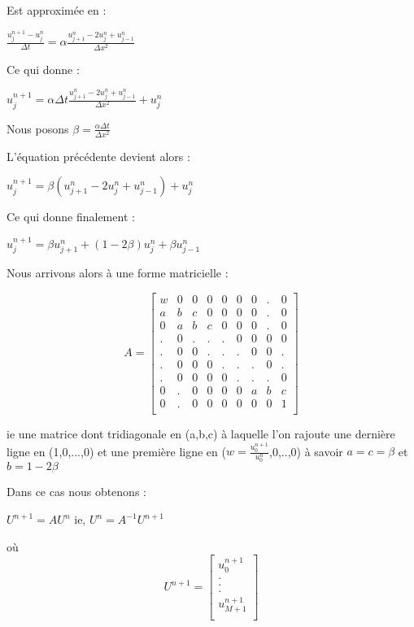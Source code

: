 \documentclass[a4paper, 12pt]{article}
\begin{document}
Est approximée en : 

$\frac{u^{n+1}_j-u^n_j}{\Delta{t}}=\alpha \frac{u^n_{j+1}-2u^n_j+u^n_{j-1}}{\Delta{x}^2}$

Ce qui donne : 

$u^{n+1}_j=\alpha \Delta{t} \frac{u^n_{j+1}-2u^n_j+u^n_{j-1}}{\Delta{x}^2}+u^n_j$

Nous posons $\beta = \frac{\alpha \Delta{t}}{\Delta{x}^2}$

L'équation précédente devient alors :

$u^{n+1}_j= \beta (u^n_{j+1}-2u^n_j+u^n_{j-1})+u^n_j$

Ce qui donne finalement : 

$u^{n+1}_j= \beta u^n_{j+1} +  (1-2\beta) u^n_j + \beta u^n_{j-1}$

Nous arrivons alors à une forme matricielle :

\[
A =
\left[ {\begin{array}{ccccccccc}

w & 0 & 0 & 0  & 0 & 0 & 0 & . & 0\\ 
a  & b  & c  & 0  & 0  & 0  & 0  & .  & 0 \\ 
0  & a  & b  & c  & 0  & 0  & 0  & .  & 0\\ 
.  & 0  & .  & .  & .  & 0  & 0  & 0  & 0\\ 
.  & 0  & 0  & .  & .  & .  & 0  & 0  & . \\
.  & 0  & 0  & 0  & .  & .  & .  & 0  & . \\
.  & 0  & 0  & 0  & 0  & .  & .  & .  & 0 \\
0  & .  & 0  & 0  & 0  & 0  & a  & b  & c\\ 
0  & .  & 0  & 0  & 0  & 0  & 0  & 0  & 1 \\
\end{array} } \right]
\]

ie une matrice dont tridiagonale en (a,b,c) à laquelle l'on rajoute une dernière ligne en (1,0,...,0) et une première ligne en ($w=\frac{u^{n+1}_0}{u^n_0}$,0,..,0)
à savoir $a=c=\beta$ et $b=1-2\beta$

Dans ce cas nous obtenons : 

$U^{n+1}=AU^n$
ie,
$U^n=A^{-1}U^{n+1}$

où
\[
U^{n+1} =
\left[ {\begin{array}{c}
        u^{n+1}_0\\
        .\\
        .\\
        .\\
        u^{n+1}_{M+1}\\
\end{array} } \right]
\]
        
\end{document}
